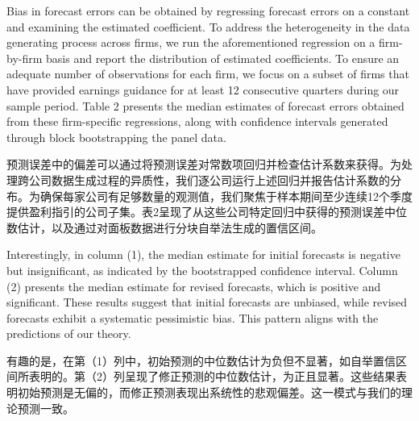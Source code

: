 \documentclass[12pt,a4paper]{article}
\newenvironment{original}
  {\par\medskip\noindent\ignorespaces}
  {\par\medskip}
\newenvironment{translation}
  {\par\noindent{\color{transblue}\ignorespaces}}
  {\par\bigskip}
\begin{document}
\begin{original}
Bias in forecast errors can be obtained by regressing forecast errors on a constant and examining the estimated coefficient. To address the heterogeneity in the data generating process across firms, we run the aforementioned regression on a firm-by-firm basis and report the distribution of estimated coefficients. To ensure an adequate number of observations for each firm, we focus on a subset of firms that have provided earnings guidance for at least 12 consecutive quarters during our sample period. Table 2 presents the median estimates of forecast errors obtained from these firm-specific regressions, along with confidence intervals generated through block bootstrapping the panel data.
\end{original}
\begin{translation}
预测误差中的偏差可以通过将预测误差对常数项回归并检查估计系数来获得。为处理跨公司数据生成过程的异质性，我们逐公司运行上述回归并报告估计系数的分布。为确保每家公司有足够数量的观测值，我们聚焦于样本期间至少连续12个季度提供盈利指引的公司子集。表2呈现了从这些公司特定回归中获得的预测误差中位数估计，以及通过对面板数据进行分块自举法生成的置信区间。
\end{translation}

\begin{original}
Interestingly, in column (1), the median estimate for initial forecasts is negative but insignificant, as indicated by the bootstrapped confidence interval. Column (2) presents the median estimate for revised forecasts, which is positive and significant. These results suggest that initial forecasts are unbiased, while revised forecasts exhibit a systematic pessimistic bias. This pattern aligns with the predictions of our theory.
\end{original}
\begin{translation}
有趣的是，在第（1）列中，初始预测的中位数估计为负但不显著，如自举置信区间所表明的。第（2）列呈现了修正预测的中位数估计，为正且显著。这些结果表明初始预测是无偏的，而修正预测表现出系统性的悲观偏差。这一模式与我们的理论预测一致。
\end{translation}
\end{document}
